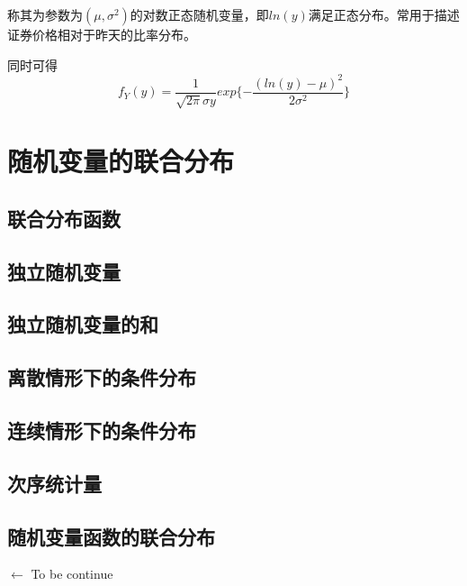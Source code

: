 \documentclass[UTF8]{ctexart}
\begin{document}
称其为参数为$(\mu ,\sigma^{2}) $的对数正态随机变量，即$ln(y)$满足正态分布。常用于描述证券价格相对于昨天的比率分布。

同时可得
$$f_{Y}(y)=\displaystyle\frac{1}{\sqrt{2\pi } \sigma y}exp\{-\frac{(ln(y)-\mu )^{2}}{2\sigma^{2}}\} $$

\newpage

\section{随机变量的联合分布}

\subsection{联合分布函数}



\subsection{独立随机变量}

\subsection{独立随机变量的和}

\subsection{离散情形下的条件分布}

\subsection{连续情形下的条件分布}

\subsection{次序统计量}

\subsection{随机变量函数的联合分布}

$\gets$ To be continue
\end{document}
